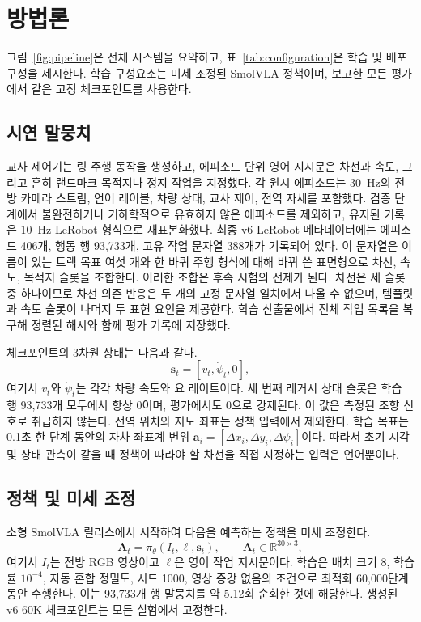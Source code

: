 \documentclass[letterpaper,conference]{IEEEtran}
\begin{document}
\section{방법론}
그림~\ref{fig:pipeline}은 전체 시스템을 요약하고, 표~\ref{tab:configuration}은 학습
및 배포 구성을 제시한다. 학습 구성요소는 미세 조정된 SmolVLA 정책이며, 보고한 모든
평가에서 같은 고정 체크포인트를 사용한다.

\subsection{시연 말뭉치}
교사 제어기는 링 주행 동작을 생성하고, 에피소드 단위 영어 지시문은 차선과 속도,
그리고 흔히 랜드마크 목적지나 정지 작업을 지정했다. 각 원시 에피소드는 30~Hz의
전방 카메라 스트림, 언어 레이블, 차량 상태, 교사 제어, 전역 자세를 포함했다. 검증
단계에서 불완전하거나 기하학적으로 유효하지 않은 에피소드를 제외하고, 유지된 기록은
10~Hz LeRobot 형식으로 재표본화했다. 최종 v6 LeRobot 메타데이터에는 에피소드
406개, 행동 행 93,733개, 고유 작업 문자열 388개가 기록되어 있다. 이 문자열은 이름이
있는 트랙 목표 여섯 개와 한 바퀴 주행 형식에 대해 바꿔 쓴 표면형으로 차선, 속도,
목적지 슬롯을 조합한다. 이러한 조합은 후속 시험의 전제가 된다. 차선은 세 슬롯 중
하나이므로 차선 의존 반응은 두 개의 고정 문자열 일치에서 나올 수 없으며, 템플릿과
속도 슬롯이 나머지 두 표현 요인을 제공한다. 학습 산출물에서 전체 작업 목록을 복구해
정렬된 해시와 함께 평가 기록에 저장했다.

체크포인트의 3차원 상태는 다음과 같다.
\begin{equation}
\mathbf{s}_t=[v_t,\dot{\psi}_t,0],
\label{eq:state}
\end{equation}
여기서 $v_t$와 $\dot{\psi}_t$는 각각 차량 속도와 요 레이트이다. 세 번째 레거시 상태
슬롯은 학습 행 93,733개 모두에서 항상 0이며, 평가에서도 0으로 강제된다. 이 값은
측정된 조향 신호로 취급하지 않는다. 전역 위치와 지도 좌표는 정책 입력에서 제외한다.
학습 목표는 0.1초 한 단계 동안의 자차 좌표계 변위
$\mathbf{a}_i=[\Delta x_i,\Delta y_i,\Delta\psi_i]$이다. 따라서 초기 시각 및 상태
관측이 같을 때 정책이 따라야 할 차선을 직접 지정하는 입력은 언어뿐이다.

\subsection{정책 및 미세 조정}
소형 SmolVLA 릴리스에서 시작하여 다음을 예측하는 정책을 미세 조정한다.
\begin{equation}
\mathbf{A}_t=\pi_\theta(I_t,\ell,\mathbf{s}_t),\qquad
\mathbf{A}_t\in\mathbb{R}^{30\times3},
\label{eq:policy}
\end{equation}
여기서 $I_t$는 전방 RGB 영상이고 $\ell$은 영어 작업 지시문이다. 학습은 배치 크기 8,
학습률 $10^{-4}$, 자동 혼합 정밀도, 시드 1000, 영상 증강 없음의 조건으로 최적화
60,000단계 동안 수행한다. 이는 93,733개 행 말뭉치를 약 5.12회 순회한 것에 해당한다.
생성된 v6-60K 체크포인트는 모든 실험에서 고정한다.
\end{document}

